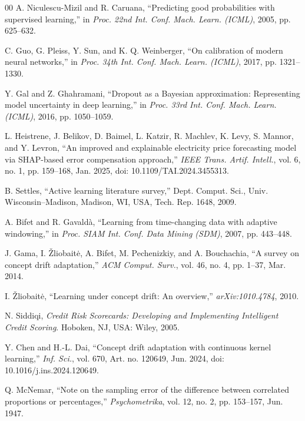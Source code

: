 \documentclass{ieeeaccess}
\begin{document}
\begin{thebibliography}{00}
 A. Niculescu-Mizil and R. Caruana, ``Predicting good probabilities with supervised learning,'' in \emph{Proc. 22nd Int. Conf. Mach. Learn. (ICML)}, 2005, pp. 625--632.

 C. Guo, G. Pleiss, Y. Sun, and K. Q. Weinberger, ``On calibration of modern neural networks,'' in \emph{Proc. 34th Int. Conf. Mach. Learn. (ICML)}, 2017, pp. 1321--1330.

 Y. Gal and Z. Ghahramani, ``Dropout as a Bayesian approximation: Representing model uncertainty in deep learning,'' in \emph{Proc. 33rd Int. Conf. Mach. Learn. (ICML)}, 2016, pp. 1050--1059.

 L. Heistrene, J. Belikov, D. Baimel, L. Katzir, R. Machlev, K. Levy, S. Mannor, and Y. Levron, ``An improved and explainable electricity price forecasting model via SHAP-based error compensation approach,'' \emph{IEEE Trans. Artif. Intell.}, vol. 6, no. 1, pp. 159--168, Jan. 2025, doi: 10.1109/TAI.2024.3455313.

 B. Settles, ``Active learning literature survey,'' Dept. Comput. Sci., Univ. Wisconsin--Madison, Madison, WI, USA, Tech. Rep. 1648, 2009.

 A. Bifet and R. Gavald\`a, ``Learning from time-changing data with adaptive windowing,'' in \emph{Proc. SIAM Int. Conf. Data Mining (SDM)}, 2007, pp. 443--448.

 J. Gama, I. \v{Z}liobait\.e, A. Bifet, M. Pechenizkiy, and A. Bouchachia, ``A survey on concept drift adaptation,'' \emph{ACM Comput. Surv.}, vol. 46, no. 4, pp. 1--37, Mar. 2014.

 I. \v{Z}liobait\.e, ``Learning under concept drift: An overview,'' \emph{arXiv:1010.4784}, 2010.

 N. Siddiqi, \emph{Credit Risk Scorecards: Developing and Implementing Intelligent Credit Scoring}. Hoboken, NJ, USA: Wiley, 2005.

 Y. Chen and H.-L. Dai, ``Concept drift adaptation with continuous kernel learning,'' \emph{Inf. Sci.}, vol. 670, Art. no. 120649, Jun. 2024, doi: 10.1016/j.ins.2024.120649.

 Q. McNemar, ``Note on the sampling error of the difference between correlated proportions or percentages,'' \emph{Psychometrika}, vol. 12, no. 2, pp. 153--157, Jun. 1947.


\end{thebibliography}
\end{document}
